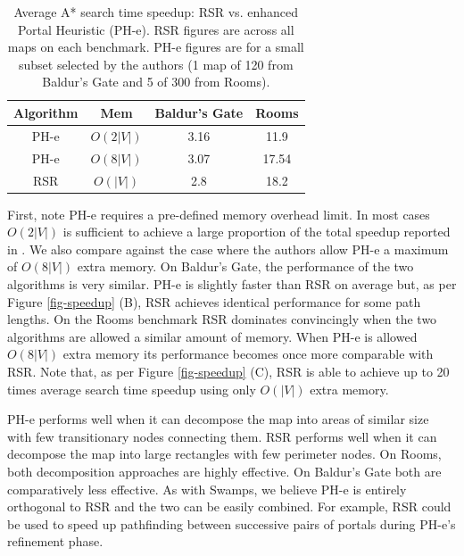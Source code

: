 \begin{table}[b]
\label{table-phspeedup}
\begin{center}
\begin{tabular}{|c|c|c|c|}
\hline
\textbf{Algorithm} & \textbf{Mem} & \textbf{Baldur's Gate} & \textbf{Rooms}  \\ \hline
PH-e & $O(2|V|)$ & 3.16 &  11.9 \\ \hline
PH-e & $O(8|V|)$ & 3.07 &  17.54 \\ \hline
RSR & $O(|V|)$ & 2.8 & 18.2 \\ \hline
\end{tabular}
\end{center}
\caption{Average A* search time speedup: RSR vs. enhanced Portal
Heuristic (PH-e). RSR figures are across all maps on each benchmark. PH-e
figures are for a small subset selected by the authors (1 map of 120 from
Baldur's Gate and 5 of 300 from Rooms). }
\end{table}

First, note PH-e requires a pre-defined memory overhead limit. In most cases $O(2|V|)$ is
sufficient to achieve a large proportion of the total speedup reported in
\cite{goldenberg10}. We also compare against the case where the authors allow 
PH-e a maximum of $O(8|V|)$ extra memory.
On Baldur's Gate, the performance of the two algorithms is very similar. PH-e is slightly
faster than RSR on average but, as per Figure \ref{fig-speedup} (B), RSR achieves
identical performance for some path lengths. 
On the Rooms benchmark RSR dominates convincingly when the two algorithms are
allowed a similar amount of memory. When PH-e is allowed $O(8|V|)$ extra memory
 its performance becomes once more comparable with RSR.
Note that, as per Figure \ref{fig-speedup} (C), RSR is able to achieve up to 20 times
average search time speedup using only $O(|V|)$ extra memory. 
\par
PH-e performs well when it can decompose the map into areas of similar size with
few transitionary nodes connecting them.
RSR performs well when it can decompose the map into large rectangles with few
perimeter nodes.
On Rooms, both decomposition approaches are highly effective. 
On Baldur's Gate both are comparatively less effective.
As with Swamps, we believe PH-e is entirely orthogonal to RSR and the two can be 
easily combined. For example, RSR could be used to speed up pathfinding between
successive pairs of portals during PH-e's refinement phase.

